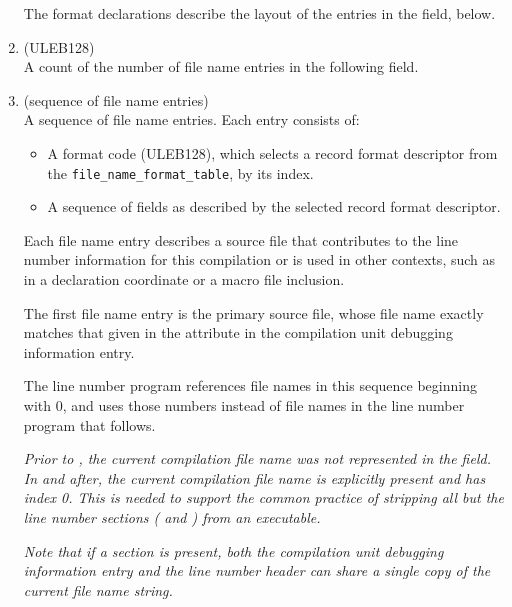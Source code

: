 \begin{enumerate}[1. ]
The format declarations describe the layout of the entries
in the \HFNfilenames{} field, below.
\eb

\item \HFNfilenamescount{} (ULEB128) \\
A count of the number of file name entries 
\db
in the following \HFNfilenames{} field.

\item \HFNfilenames{} (sequence of file name entries) \\
\bb
A sequence of file name entries. Each entry consists of:
\begin{itemize}
\setlength{\itemsep}{0em}
\item A format code (ULEB128), which selects a record format 
descriptor from the \texttt{file\_name\_format\_table}, by its index.
\item A sequence of fields as described by the selected record 
format descriptor.
\end{itemize}

Each file name entry describes a source file that
contributes
\eb
to the line number information for this
compilation or is used in other contexts, such as in
a declaration coordinate or a macro file inclusion.
 
\bb
The first file name entry is the primary source file,
\eb 
whose file name exactly matches that given in the 
\DWATname{} attribute in the compilation unit 
debugging information entry.
   
The line number program references file names in this 
sequence beginning with 0, and uses those numbers instead 
of file names in the line number program that follows.

\textit{Prior to \DWARFVersionV, the current compilation 
file name was not represented in the \HFNfilenames{}
field. In \DWARFVersionV and 
\bbeb
after, the current compilation file name 
is explicitly present and has index 0. This is needed to support 
the common practice of stripping all but the line number sections
(\dotdebugline{} and \dotdebuglinestr) from an executable.}

\textit{Note that if a \dotdebuglinestr{} section is present, 
both the compilation unit debugging information entry 
and the line number header can
share a single copy of the current file name string.}

\end{enumerate}

